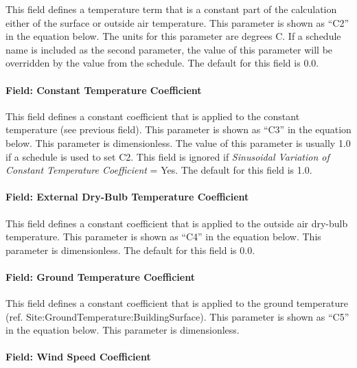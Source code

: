 This field defines a temperature term that is a constant part of the calculation either of the surface or outside air temperature. This parameter is shown as ``C2'' in the equation below. The units for this parameter are degrees C. If a schedule name is included as the second parameter, the value of this parameter will be overridden by the value from the schedule. The default for this field is 0.0.

\paragraph{Field: Constant Temperature Coefficient}\label{field-constant-temperature-coefficient}

This field defines a constant coefficient that is applied to the constant temperature (see previous field). This parameter is shown as ``C3'' in the equation below. This parameter is dimensionless. The value of this parameter is usually 1.0 if a schedule is used to set C2. This field is ignored if \emph{Sinusoidal Variation of Constant Temperature Coefficient} = Yes. The default for this field is 1.0.

\paragraph{Field: External Dry-Bulb Temperature Coefficient}\label{field-external-dry-bulb-temperature-coefficient}

This field defines a constant coefficient that is applied to the outside air dry-bulb temperature. This parameter is shown as ``C4'' in the equation below. This parameter is dimensionless. The default for this field is 0.0.

\paragraph{Field: Ground Temperature Coefficient}\label{field-ground-temperature-coefficient}

This field defines a constant coefficient that is applied to the ground temperature (ref. Site:GroundTemperature:BuildingSurface). This parameter is shown as ``C5'' in the equation below. This parameter is dimensionless.

\paragraph{Field: Wind Speed Coefficient}\label{field-wind-speed-coefficient}

